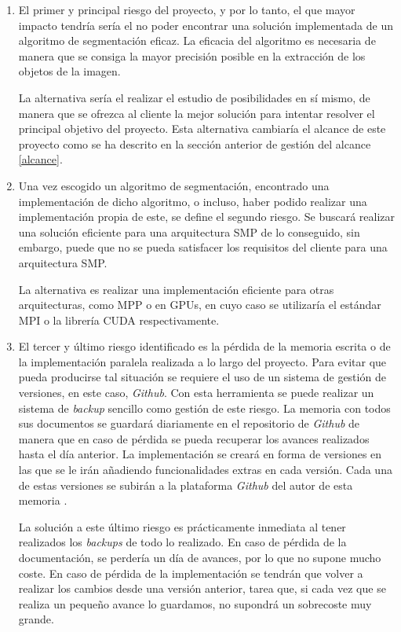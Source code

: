 \begin{enumerate}
	\item El primer y principal riesgo del proyecto, y por lo tanto, el que mayor impacto tendr\'{i}a ser\'{i}a el no poder encontrar una soluci\'{o}n implementada de un algoritmo de segmentaci\'{o}n eficaz. La eficacia del algoritmo es necesaria de manera que se consiga la mayor precisi\'{o}n posible en la extracci\'{o}n de los objetos de la imagen.
	
	La alternativa ser\'{i}a el realizar el estudio de posibilidades en s\'{i} mismo, de manera que se ofrezca al cliente la mejor soluci\'{o}n para intentar resolver el principal objetivo del proyecto. Esta alternativa cambiar\'{i}a el alcance de este proyecto como se ha descrito en la secci\'{o}n anterior de gesti\'{o}n del alcance \ref{alcance}.
	
	\item Una vez escogido un algoritmo de segmentaci\'{o}n, encontrado una implementaci\'{o}n de dicho algoritmo, o incluso, haber podido realizar una implementaci\'{o}n propia de este, se define el segundo riesgo. Se buscar\'{a} realizar una soluci\'{o}n eficiente para una arquitectura SMP de lo conseguido, sin embargo, puede que no se pueda satisfacer los requisitos del cliente para una arquitectura SMP.
	
	La alternativa es realizar una implementaci\'{o}n eficiente para otras arquitecturas, como MPP o en GPUs, en cuyo caso se utilizar\'{i}a el est\'{a}ndar MPI o la librer\'{i}a CUDA respectivamente.
	
	\item El tercer y \'{u}ltimo riesgo identificado es la p\'{e}rdida de la memoria escrita o de la implementaci\'{o}n paralela realizada a lo largo del proyecto. Para evitar que pueda producirse tal situaci\'{o}n se requiere el uso de un sistema de gesti\'{o}n de versiones, en este caso, \textit{Github}. Con esta herramienta se puede realizar un sistema de \textit{backup} sencillo como gesti\'{o}n de este riesgo. La memoria con todos sus documentos se guardar\'{a} diariamente en el repositorio de \textit{Github} de manera que en caso de p\'{e}rdida se pueda recuperar los avances realizados hasta el d\'{i}a anterior. La implementaci\'{o}n se crear\'{a} en forma de versiones en las que se le ir\'{a}n a\~{n}adiendo funcionalidades extras en cada versi\'{o}n. Cada una de estas versiones se subir\'{a}n a la plataforma \textit{Github} del autor de esta memoria \cite{gitHub1}. 
	
	La soluci\'{o}n a este \'{u}ltimo riesgo es pr\'{a}cticamente inmediata al tener realizados los \textit{backups} de todo lo realizado. En caso de p\'{e}rdida de la documentaci\'{o}n, se perder\'{i}a un d\'{i}a de avances, por lo que no supone mucho coste. En caso de p\'{e}rdida de la implementaci\'{o}n se tendr\'{a}n que volver a realizar los cambios desde una versi\'{o}n anterior, tarea que, si cada vez que se realiza un peque\~{n}o avance lo guardamos, no supondr\'{a} un sobrecoste muy grande.
	
\end{enumerate}
